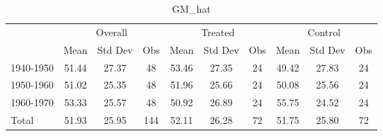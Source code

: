 \begin{table}[htbp]\centering
\def\sym#1{\ifmmode^{#1}\else\(^{#1}\)\fi}
\caption{GM\_hat \label{tab1}}
\begin{tabular}{l*{3}{ccc}}
\toprule
                    &\multicolumn{3}{c}{Overall}           &\multicolumn{3}{c}{Treated}           &\multicolumn{3}{c}{Control}           \\
                    &        Mean&     Std Dev&         Obs&        Mean&     Std Dev&         Obs&        Mean&     Std Dev&         Obs\\
\midrule
1940-1950           &       51.44&       27.37&          48&       53.46&       27.35&          24&       49.42&       27.83&          24\\
1950-1960           &       51.02&       25.35&          48&       51.96&       25.66&          24&       50.08&       25.56&          24\\
1960-1970           &       53.33&       25.57&          48&       50.92&       26.89&          24&       55.75&       24.52&          24\\
Total               &       51.93&       25.95&         144&       52.11&       26.28&          72&       51.75&       25.80&          72\\
\bottomrule
\end{tabular}
\end{table}
